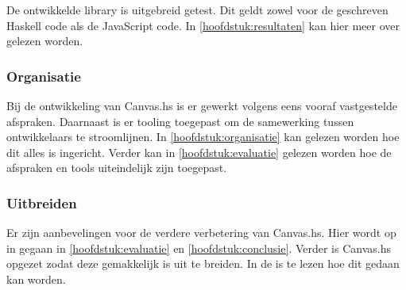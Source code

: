 De ontwikkelde library is uitgebreid getest. Dit geldt zowel voor de geschreven Haskell code als de JavaScript code. In \autoref{hoofdstuk:resultaten} kan hier meer over gelezen worden.

\subsubsection{Organisatie}
Bij de ontwikkeling van Canvas.hs is er gewerkt volgens eens vooraf vastgestelde afspraken. Daarnaast is er tooling toegepast om de samewerking tussen ontwikkelaars te stroomlijnen. In \autoref{hoofdstuk:organisatie} kan gelezen worden hoe dit alles is ingericht. Verder kan in \autoref{hoofdstuk:evaluatie} gelezen worden hoe de afspraken en tools uiteindelijk zijn toegepast.

\subsubsection{Uitbreiden}
Er zijn aanbevelingen voor de verdere verbetering van Canvas.hs. Hier wordt op in gegaan in \autoref{hoofdstuk:evaluatie} en \autoref{hoofdstuk:conclusie}. Verder is Canvas.hs opgezet zodat deze gemakkelijk is uit te breiden. In de  is te lezen hoe dit gedaan kan worden.





